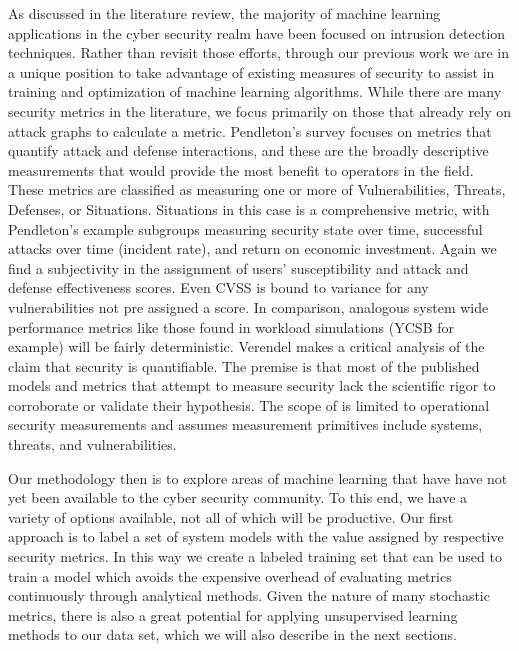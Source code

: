 


As discussed in the literature review, the majority of machine learning applications in the cyber security realm have been focused on intrusion detection techniques. Rather than revisit those efforts, through our previous work we are in a unique position to take advantage of existing measures of security to assist in training and optimization of machine learning algorithms. While there are many security metrics in the literature, we focus primarily on those that already rely on attack graphs to calculate a metric. Pendleton’s survey\cite{Pendleton_Garcia-Lebron_Cho_Xu_2016} focuses on metrics that quantify attack and defense interactions, and these are the broadly descriptive measurements that would provide the most benefit to operators in the field. These metrics are classified as measuring one or more of Vulnerabilities, Threats, Defenses, or Situations. Situations in this case is a comprehensive metric, with Pendleton’s example subgroups measuring security state over time, successful attacks over time (incident rate), and return on economic investment. Again we find a subjectivity in the  assignment of users’ susceptibility and attack and defense effectiveness scores. Even CVSS is bound to variance for any vulnerabilities not pre assigned a score. In comparison, analogous system wide performance metrics like those found in workload simulations (YCSB for example) will be fairly deterministic. Verendel\cite{Verendel_2009} makes a critical analysis of the claim that security is quantifiable. The premise is that most of the published models and metrics that attempt to measure security lack the scientific rigor to corroborate or validate their hypothesis. The scope of is limited to operational security measurements and assumes measurement primitives include systems, threats, and vulnerabilities.

Our methodology then is to explore areas of machine learning that have have not yet been available to the cyber security community. To this end, we have a variety of options available, not all of which will be productive. Our first approach is to label a set of system models with the value assigned by respective security metrics. In this way we create a labeled training set that can be used to train a model which avoids the expensive overhead of evaluating metrics continuously through analytical methods. Given the nature of many stochastic metrics, there is also a great potential for applying unsupervised learning methods to our data set, which we will also describe in the next sections. 